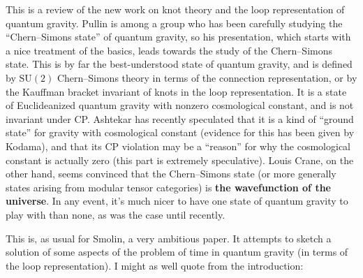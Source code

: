 \documentclass[12pt]{article}
\def\tightlist{}
\renewcommand{\texttt}[1]{%
  \begingroup
  \ttfamily
  \begingroup\lccode`~=`/\lowercase{\endgroup\def~}{/\discretionary{}{}{}}%
  \begingroup\lccode`~=`[\lowercase{\endgroup\def~}{[\discretionary{}{}{}}%
  \begingroup\lccode`~=`.\lowercase{\endgroup\def~}{.\discretionary{}{}{}}%
  \catcode`/=\active\catcode`[=\active\catcode`.=\active
  \scantokens{#1\noexpand}%
  \endgroup
}
\begin{document}
This is a review of the new work on knot theory and the loop
representation of quantum gravity. Pullin is among a group who has been
carefully studying the ``Chern--Simons state'' of quantum gravity, so his
presentation, which starts with a nice treatment of the basics, leads
towards the study of the Chern--Simons state. This is by far the
best-understood state of quantum gravity, and is defined by
\(\mathrm{SU}(2)\) Chern--Simons theory in terms of the connection
representation, or by the Kauffman bracket invariant of knots in the
loop representation. It is a state of Euclideanized quantum gravity with
nonzero cosmological constant, and is not invariant under CP. Ashtekar
has recently speculated that it is a kind of ``ground state'' for
gravity with cosmological constant (evidence for this has been given by
Kodama), and that its CP violation may be a ``reason'' for why the
cosmological constant is actually zero (this part is extremely
speculative). Louis Crane, on the other hand, seems convinced that the
Chern--Simons state (or more generally states arising from modular tensor
categories) is \textbf{the wavefunction of the universe}. In any event,
it's much nicer to have one state of quantum gravity to play with than
none, as was the case until recently.

\noindent
This is, as usual for Smolin, a very ambitious paper. It attempts to
sketch a solution of some aspects of the problem of time in quantum
gravity (in terms of the loop representation). I might as well quote
from the introduction:
\end{document}
